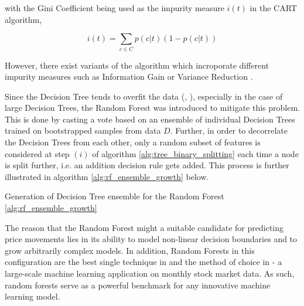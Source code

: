 with the Gini Coefficient being used as the impurity measure $i(t)$ in the CART algorithm,

\begin{equation}
    i(t) = \sum_{c \in C} p(c|t) (1 - p(c|t))
\end{equation}

However, there exist variants of the algorithm which incroporate different impurity measures such as
Information Gain or Variance Reduction \cite{rutkowski2011cart}.

Since the Decision Tree tends to overfit the data (\cite{kerdprasop2011discreteDecisionTree}, \cite{geman1992biasVariance}),
especially in the case of large Decision Trees,
the Random Forest was introduced to mitigate this problem. This is done by casting a vote based on an 
ensemble of individual Decision Trees trained on bootstrapped samples from data $D$. 
Further, in order to decorrelate the Decision Trees from each other, 
only a random subset of features is considered at step $(i)$ of algorithm \ref{alg:tree_binary_splitting} 
each time a node is split further, i.e. an addition decision rule gets added.
This process is further illustrated in algorithm \ref{alg:rf_ensemble_growth} below.

\begin{algorithm}[H]
    \caption{ Generation of Decision Tree ensemble for the Random Forest \ref{alg:rf_ensemble_growth} }
    \label{alg:rf_ensemble_growth}
\end{algorithm}

The reason that the Random Forest might a suitable candidate for predicting price movements 
lies in its ability to model non-linear decision boundaries and to grow arbitrarily complex models.
In addition, Random Forests in this configuration are the best single technique in \cite{krauss2016arbitrageSandP}
and the method of choice in \cite{moritz2014partFutureReturns} - a large-scale machine learning application
on monthly stock market data. As such, random forests serve as a powerful benchmark for any
innovative machine learning model.

